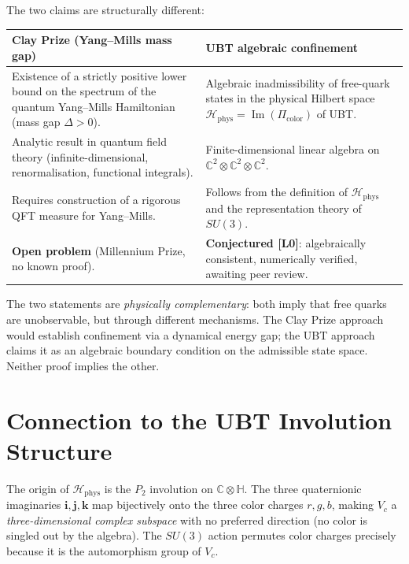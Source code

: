 \documentclass[12pt,a4paper]{article}
\newcommand{\Hphys}{\mathcal{H}_{\mathrm{phys}}}
\newcommand{\Picolor}{\Pi_{\mathrm{color}}}
\newcommand{\CCC}{\mathbb{C}}
\newcommand{\HH}{\mathbb{H}}
\begin{document}
The two claims are structurally different:

\begin{center}
\begin{tabular}{p{}p{}}
\hline
\textbf{Clay Prize (Yang--Mills mass gap)} & \textbf{UBT algebraic confinement} \\
\hline
Existence of a strictly positive lower bound on the spectrum of the quantum
Yang--Mills Hamiltonian (mass gap $\Delta > 0$). &
Algebraic inadmissibility of free-quark states in the physical Hilbert space
$\Hphys = \operatorname{Im}(\Picolor)$ of UBT. \\[4pt]
Analytic result in quantum field theory (infinite-dimensional, renormalisation,
functional integrals). &
Finite-dimensional linear algebra on $\CCC^2 \otimes \CCC^2 \otimes \CCC^2$.
\\[4pt]
Requires construction of a rigorous QFT measure for Yang--Mills. &
Follows from the definition of $\Hphys$ and the representation theory of
$SU(3)$. \\[4pt]
\textbf{Open problem} (Millennium Prize, no known proof). &
\textbf{Conjectured [L0]}: algebraically consistent, numerically verified,
awaiting peer review. \\
\hline
\end{tabular}
\end{center}

\medskip
The two statements are \emph{physically complementary}: both imply that free
quarks are unobservable, but through different mechanisms.  The Clay Prize
approach would establish confinement via a dynamical energy gap; the UBT approach
claims it as an algebraic boundary condition on the admissible state space.
Neither proof implies the other.

\section{Connection to the UBT Involution Structure}
\label{sec:connection}

The origin of $\Hphys$ is the $P_2$ involution on $\CCC \otimes \HH$.
The three quaternionic imaginaries $\mathbf{i},\mathbf{j},\mathbf{k}$ map
bijectively onto the three color charges $r,g,b$, making $V_c$ a
\emph{three-dimensional complex subspace} with no preferred direction
(no color is singled out by the algebra).  The $SU(3)$ action permutes color
charges precisely because it is the automorphism group of $V_c$.
\end{document}

